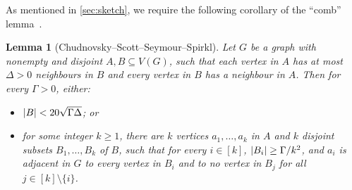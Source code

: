 \documentclass[11pt,reqno]{amsart}
\newtheorem{lemma}[theorem]{Lemma}
\newcommand{\dd}{\textquotedblleft}
\newcommand{\ee}{\textquotedblright}
\renewcommand{\subset}{\subseteq}
\DeclarePairedDelimiter\abs{\lvert}{\rvert}%
\begin{document}
	As mentioned in \cref{sec:sketch}, we require the following corollary of the \dd comb\ee{} lemma~\cite[Lemma 2.1]{MR4563865}.
	\begin{lemma}
		[Chudnovsky--Scott--Seymour--Spirkl]
		\label{lem:comb}
		Let $G$ be a graph with nonempty and disjoint $A,B\subset V(G)$, such that each vertex in $A$ has at most $\Delta>0$ neighbours in $B$ and every vertex in $B$ has a neighbour in $A$. Then for every $\Gamma>0$, either:
		\begin{itemize}
			\item $\abs B<20\sqrt{\Gamma\Delta}$; or
			
			\item for some integer $k\ge1$, there are $k$ vertices $a_1,\ldots,a_k$ in $A$ and $k$ disjoint subsets $B_1,\ldots,B_k$ of $B$, such that for every $i\in[k]$, $\abs{B_i}\ge\Gamma/k^2$, and $a_i$ is adjacent in $G$ to every vertex in $B_i$ and to no vertex in $B_j$ for all $j\in[k]\setminus\{i\}$.
		\end{itemize}
	\end{lemma}
	
\end{document}
